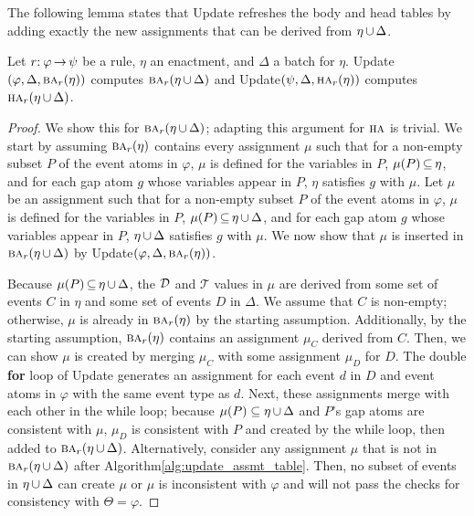 The following lemma states that 
{\sf Update} refreshes the body and head tables
by adding exactly the new assignments that can be derived from $\eta\,{\cup}\,\Delta$.

\begin{lemma}\label{lemma:update-correctness}
  Let $r{:}\:\varphi\,{\rightarrow}\,\psi$ be a rule,
  $\eta$ an enactment,
  and $\Delta$ a batch for $\eta$.
  {\sf Update}$(\varphi, \Delta, \BODY/_r(\eta))$
  computes 
  $\BODY/_r(\eta\tight\cup\Delta)$ and
  {\sf Update}$(\psi, \Delta, \HEAD/_r(\eta))$ computes
  $\HEAD/_r(\eta\tight\cup\Delta)$.
\end{lemma}

\begin{proof}
  We show this for $\BODY/_r(\eta\tight\cup\Delta)$;
  adapting this argument for $\HEAD/$ is trivial.
  We start by assuming $\BODY/_r(\eta)$
  contains every assignment $\mu$ such that
  for a non-empty subset $P$ of the event atoms in $\varphi$,
  $\mu$ is defined for the variables in $P$,
  $\mu(P)\,{\subseteq}\, \eta$,
  and 
  for each gap atom $g$ whose variables appear in $P$, 
  $\eta$ satisfies $g$ with $\mu$.
  Let $\mu$ be an assignment
  such that for a non-empty subset $P$ of the event atoms in $\varphi$,
  $\mu$ is defined for the variables in $P$,
  $\mu(P)\,{\subseteq}\, \eta\,{\cup}\,\Delta$,
  and
  for each gap atom $g$ whose variables appear in $P$,
  $\eta\,{\cup}\,\Delta$ satisfies $g$ with $\mu$.
  We now show that $\mu$ is inserted in
  $\BODY/_r(\eta\tight\cup\Delta)$
  by {\sf Update}$(\varphi, \Delta, \BODY/_r(\eta))$.

  Because $\mu(P)\,{\subseteq}\, \eta\,{\cup}\,\Delta$,
  the $\mathcal{D}$ and $\mathcal{T}$ values in $\mu$ are derived
  from some set of events $C$ in $\eta$
  and some set of events $D$ in $\Delta$.
  We assume that $C$ is non-empty;
  otherwise,
  $\mu$ is already in $\BODY/_r(\eta)$ by the starting assumption.
  Additionally, by the starting assumption,
  $\BODY/_r(\eta)$ contains an assignment $\mu_C$ derived from $C$.
  Then, we can show $\mu$ is created by merging $\mu_C$
  with some assignment $\mu_D$ for $D$.
  The double {\bf for} loop of {\sf Update} generates an assignment for each
  event $d$ in $D$ 
  and event atoms in $\varphi$ with the same event type as $d$.
  Next,
  these assignments merge with each other in the while loop;
  because $\mu(P)\subseteq \eta\,{\cup}\,\Delta$
  and 
  $P$'s gap atoms are consistent with $\mu$,
  $\mu_D$ is consistent with $P$ and created by the while loop,
  then added to $\BODY/_r(\eta\tight\cup\Delta)$.
  Alternatively,
  consider any assignment $\mu$ that is not in
  $\BODY/_r(\eta\tight\cup\Delta)$
  after Algorithm\:\ref{alg:update_assmt_table}.
  Then,
  no subset of events in $\eta\,{\cup}\,\Delta$ can create $\mu$
  or
  $\mu$ is inconsistent with $\varphi$ and
  will not pass the checks for consistency with $\Theta=\varphi$.
\end{proof}

